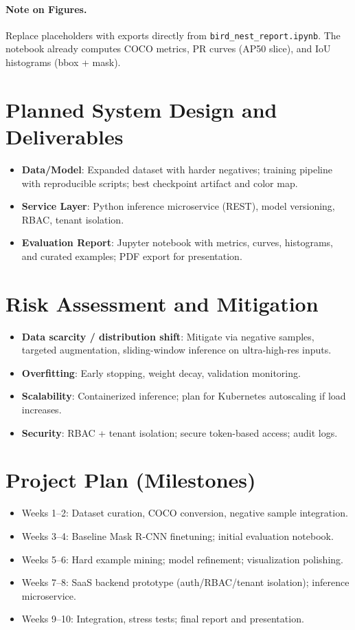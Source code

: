 \documentclass[11pt,a4paper]{article}
\begin{document}
\paragraph{Note on Figures.}
Replace placeholders with exports directly from \texttt{bird\_nest\_report.ipynb}. The notebook already computes COCO metrics, PR curves (AP50 slice), and IoU histograms (bbox + mask).

\section{Planned System Design and Deliverables}
\begin{itemize}[leftmargin=*]
  \item \textbf{Data/Model}: Expanded dataset with harder negatives; training pipeline with reproducible scripts; best checkpoint artifact and color map.
  \item \textbf{Service Layer}: Python inference microservice (REST), model versioning, RBAC, tenant isolation.
  \item \textbf{Evaluation Report}: Jupyter notebook with metrics, curves, histograms, and curated examples; PDF export for presentation.
\end{itemize}

\section{Risk Assessment and Mitigation}
\begin{itemize}[leftmargin=*]
  \item \textbf{Data scarcity / distribution shift}: Mitigate via negative samples, targeted augmentation, sliding-window inference on ultra-high-res inputs.
  \item \textbf{Overfitting}: Early stopping, weight decay, validation monitoring.
  \item \textbf{Scalability}: Containerized inference; plan for Kubernetes autoscaling if load increases.
  \item \textbf{Security}: RBAC + tenant isolation; secure token-based access; audit logs.
\end{itemize}

\section{Project Plan (Milestones)}
\begin{itemize}[leftmargin=*]
  \item Weeks 1--2: Dataset curation, COCO conversion, negative sample integration.
  \item Weeks 3--4: Baseline Mask R-CNN finetuning; initial evaluation notebook.
  \item Weeks 5--6: Hard example mining; model refinement; visualization polishing.
  \item Weeks 7--8: SaaS backend prototype (auth/RBAC/tenant isolation); inference microservice.
  \item Weeks 9--10: Integration, stress tests; final report and presentation.
\end{itemize}
\end{document}
